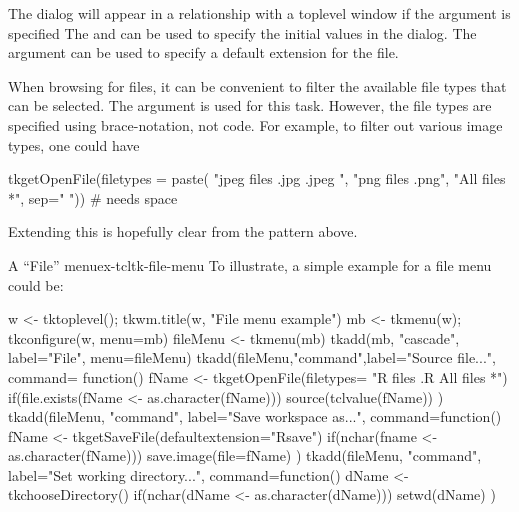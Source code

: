 The dialog will appear in a relationship with a toplevel window if the argument
 is specified The
 and
 can be used to specify the
initial values in the dialog.  The
 argument can be used to
specify a default extension for the file.

When browsing for files, it can be convenient to filter the available
file types that can be selected. The  argument is used for this task. However,
the file types are specified using \TCL\/ brace-notation, not \R\/ code. For example,
to filter out various image types, one could have 
\begin{Schunk}
\begin{Sinput}
 tkgetOpenFile(filetypes = paste(
                 "{{jpeg files} {.jpg .jpeg} }",
                 "{{png files} {.png}}",
                 "{{All files} {*}}", sep=" ")) # needs space
\end{Sinput}
\end{Schunk}
Extending this is hopefully clear from the pattern above.

\begin{example}{A ``File'' menu}{ex-tcltk-file-menu}
  To illustrate, a simple example for a file menu could be:
\begin{Schunk}
\begin{Sinput}
 w <- tktoplevel(); tkwm.title(w, "File menu example")
 mb <- tkmenu(w); tkconfigure(w, menu=mb)
 fileMenu <- tkmenu(mb)
 tkadd(mb, "cascade", label="File", menu=fileMenu)
 tkadd(fileMenu,"command",label="Source file...",
       command= function() {
         fName <- tkgetOpenFile(filetypes=
                         "{{R files} {.R}} {{All files} *}")
         if(file.exists(fName <- as.character(fName)))
            source(tclvalue(fName))
       })
 tkadd(fileMenu, "command", label="Save workspace as...",
       command=function() {
         fName <- tkgetSaveFile(defaultextension="Rsave")
         if(nchar(fname <- as.character(fName)))
           save.image(file=fName)
       })
 tkadd(fileMenu, "command", label="Set working directory...",
       command=function() {
         dName <- tkchooseDirectory()
         if(nchar(dName <- as.character(dName)))
           setwd(dName)
       })
\end{Sinput}
\end{Schunk}
\end{example}


